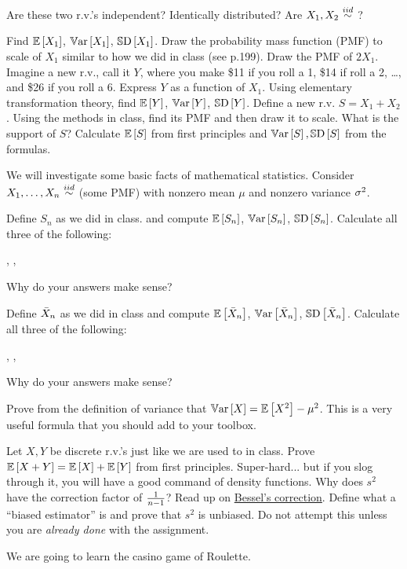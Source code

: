 \documentclass[12pt]{article}
\begin{document}
\begin{enumerate}
\easysubproblem Are these two r.v.'s independent? Identically distributed? Are $X_1, X_2 \iid$?

\easysubproblem Find $\mathbb{E}\left[X_1\right]$, $\mathbb{V}\text{ar}\left[X_1\right]$, $\mathbb{S}\text{D}\left[X_1\right]$.
\easysubproblem Draw the probability mass function (PMF) to scale of $X_1$ similar to how we did in class (see p.199). 
\easysubproblem Draw the PMF of $2X_1$.
\easysubproblem Imagine a new r.v., call it $Y$, where you make \$11 if you roll a 1, \$14 if roll a 2, \ldots, and \$26 if you roll a 6. Express $Y$ as a function of $X_1$. Using elementary transformation theory, find $\mathbb{E}\left[Y\right]$, $\mathbb{V}\text{ar}\left[Y\right]$, $\mathbb{S}\text{D}\left[Y\right]$.
\intermediatesubproblem Define a new r.v. $S = X_1 + X_2$. Using the methods in class, find its PMF and then draw it to scale.
\easysubproblem What is the support of $S$?
\easysubproblem Calculate $\mathbb{E}\left[S\right]$ from first principles and $\mathbb{V}\text{ar}\left[S\right], \mathbb{S}\text{D}\left[S\right]$ from the formulas.
\end{enumerate}

\problem We will investigate some basic facts of mathematical statistics. Consider $\Xoneton \iid$(some PMF) with nonzero mean $\mu$ and nonzero variance $\sigma^2$.


\begin{enumerate}
\easysubproblem Define $S_n$ as we did in class. and compute $\mathbb{E}\left[S_n\right]$, $\mathbb{V}\text{ar}\left[S_n\right]$, $\mathbb{S}\text{D}\left[S_n\right]$. 
\easysubproblem Calculate all three of the following:

\beqn
\limitn {}, \quad \limitn {}, \quad \limitn {}
\eeqn

Why do your answers make sense?

\easysubproblem Define $\bar{X}_n$ as we did in class and compute $\mathbb{E}\left[\bar{X}_n\right]$, $\mathbb{V}\text{ar}\left[\bar{X}_n\right]$, $\mathbb{S}\text{D}\left[\bar{X}_n\right]$. 
\easysubproblem Calculate all three of the following:

\beqn
\limitn {}, \quad \limitn {}, \quad \limitn {}
\eeqn

Why do your answers make sense?

%

\hardsubproblem Prove from the definition of variance that $\mathbb{V}\text{ar}\left[X\right] = \mathbb{E}\left[X^2\right] - \mu^2$. This is a very useful formula that you should add to your toolbox.

\extracreditsubproblem Let $X, Y$ be discrete r.v.'s just like we are used to in class. Prove $\mathbb{E}\left[X+Y\right] = \mathbb{E}\left[X\right] + \mathbb{E}\left[Y\right]$ from first principles. Super-hard... but if you slog through it, you will have a good command of density functions.
\extracreditsubproblem Why does $s^2$ have the correction factor of $\frac{1}{n-1}$? Read up on \href{http://en.wikipedia.org/wiki/Bessel's\_correction}{Bessel's correction}. Define what a ``biased estimator'' is and prove that $s^2$ is unbiased. Do not attempt this unless you are \textit{already done} with the assignment.
\end{enumerate}
\pagebreak
\problem We are going to learn the casino game of Roulette.
\end{document}
